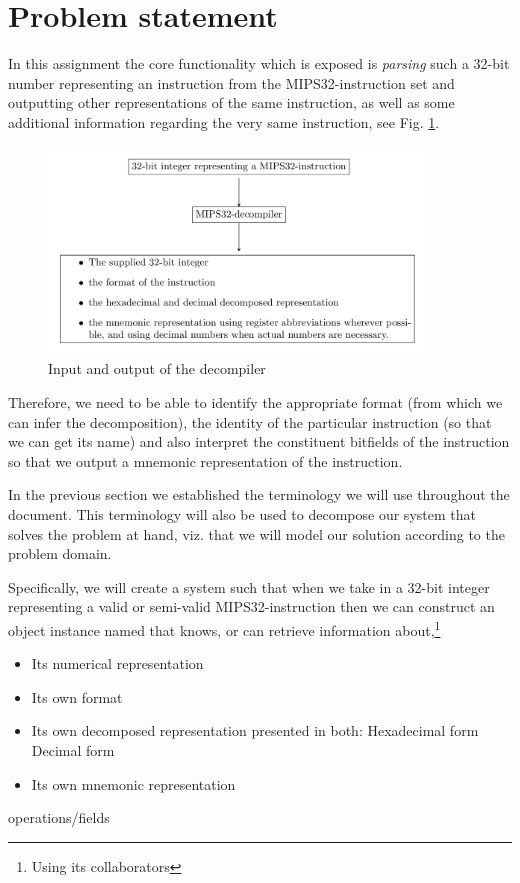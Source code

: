 \section{Problem statement}

In this assignment the core functionality which is exposed is
\emph{parsing} such a 32-bit number representing an instruction from
the MIPS32-instruction set and outputting other representations of the
same instruction, as well as some additional information regarding the
very same instruction, see Fig. \ref{fig:mips32-decompiler}.

\begin{figure}[H]
  \centering
  \includegraphics[width=0.9\textwidth]{figures/mips32-decompiler.png}
  \caption{Input and output of the decompiler}
  \label{fig:mips32-decompiler}
\end{figure}

Therefore, we need to be able to identify the appropriate format (from
which we can infer the decomposition), the identity of the particular
instruction (so that we can get its name) and also interpret the
constituent bitfields of the instruction so that we output a mnemonic
representation of the instruction.

In the previous section we established the terminology we will use
throughout the document. This terminology will also be used to
decompose our system that solves the problem at hand, viz. that
we will model our solution according to the problem domain.

Specifically, we will create a system such that when we take in a
32-bit integer representing a valid or semi-valid MIPS32-instruction
then we can construct an object instance named  that
knows, or can retrieve information about,\footnote{Using its
collaborators}

\begin{table}
\begin{itemize}
\item Its numerical representation
\item Its own format
\item Its own decomposed representation presented in both:
\subitem Hexadecimal form
\subitem Decimal form
\item Its own mnemonic representation
\end{itemize}
\caption{ operations/fields}
\label{table:instruction-operations}
\end{table}

